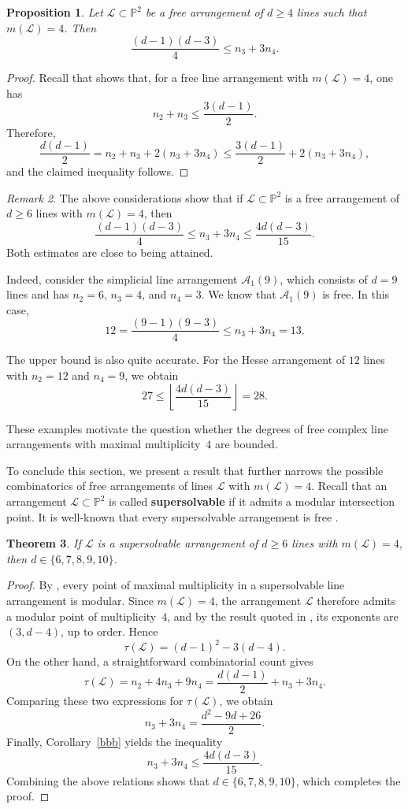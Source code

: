 \documentclass[11pt]{article}
\theoremstyle{plain}
\newtheorem{theorem}{Theorem}[section]
\newtheorem{proposition}[theorem]{Proposition}
\theoremstyle{definition}
\theoremstyle{remark}
\newtheorem{remark}[theorem]{Remark}
\begin{document}
\begin{proposition}
Let $\mathcal{L} \subset \mathbb{P}^{2}$ be a free arrangement of $d\geq 4$ lines such that $m(\mathcal{L})=4$. Then
\[\frac{(d-1)(d-3)}{4} \leq n_{3}+3n_{4}.\]
\end{proposition}
\begin{proof}
Recall that \cite[Proposition 3.1]{JL} shows that, for a free line arrangement with $m(\mathcal L)=4$, one has
$$n_{2} + n_{3} \leq \frac{3(d-1)}{2}.$$
Therefore,
$$\frac{d(d-1)}{2}  = n_{2} + n_{3} + 2(n_{3}+3n_{4}) \leq \frac{3(d-1)}{2} + 2(n_{3}+3n_{4}),$$
and the claimed inequality follows.
\end{proof}
\begin{remark}
The above considerations show that if 
$\mathcal{L} \subset \mathbb{P}^{2}$ is a free arrangement of $d \ge 6$ lines with $m(\mathcal{L}) = 4$, then
\[\frac{(d-1)(d-3)}{4} \le n_{3} + 3n_{4} \le \frac{4d(d-3)}{15}.\]
Both estimates are close to being attained.

Indeed, consider the simplicial line arrangement $\mathcal{A}_{1}(9)$, which consists of $d=9$ lines and has
$n_{2}=6$, $n_{3}=4$, and $n_{4}=3$. We know that $\mathcal{A}_{1}(9)$ is free. In this case,
\[12 = \frac{(9-1)(9-3)}{4} \le n_{3} + 3n_{4} = 13.\]

The upper bound is also quite accurate. For the Hesse arrangement of $12$ lines with
$n_{2} = 12$ and $n_{4} = 9$, we obtain
\[27 \le \left\lfloor \frac{4d(d-3)}{15} \right\rfloor = 28.\]

These examples motivate the question whether the degrees of free complex line arrangements with maximal multiplicity~$4$ are bounded.
\end{remark}
To conclude this section, we present a result that further narrows the possible combinatorics of free arrangements of lines $\mathcal{L}$ with $m(\mathcal{L})=4$. Recall that an arrangement $\mathcal{L} \subset \mathbb{P}^{2}$ is called \textbf{supersolvable} if it admits a modular intersection point. It is well-known that every supersolvable arrangement is free \cite{TJ}.
\begin{theorem}
\label{super}
If $\mathcal{L}$ is a supersolvable arrangement of $d\geq 6$ lines with $m(\mathcal{L})=4$, then $d \in \{6,7,8,9,10\}$.
\end{theorem}
\begin{proof}
By \cite[Lemma~2.1]{AT}, every point of maximal multiplicity in a supersolvable line arrangement is modular. Since $m(\mathcal L)=4$, the arrangement $\mathcal L$ therefore admits a modular point of multiplicity~$4$, and by the result quoted in \cite[Theorem~1.12(1)]{Sol}, its exponents are $(3,d-4)$, up to order. Hence
\[
\tau(\mathcal L)=(d-1)^2-3(d-4).
\]
On the other hand, a straightforward combinatorial count gives
\[\tau(\mathcal{L}) = n_{2} + 4n_{3} + 9n_{4}
= \frac{d(d-1)}{2} + n_{3} + 3n_{4}.\]
Comparing these two expressions for $\tau(\mathcal{L})$, we obtain
\[n_{3} + 3n_{4} = \frac{d^{2} - 9d + 26}{2}.\]
Finally, Corollary~\ref{bbb} yields the inequality
\[n_{3} + 3n_{4} \leq \frac{4d(d-3)}{15}.\]
Combining the above relations shows that $d \in \{6,7,8,9,10\}$, which completes the proof.
\end{proof}
\end{document}

